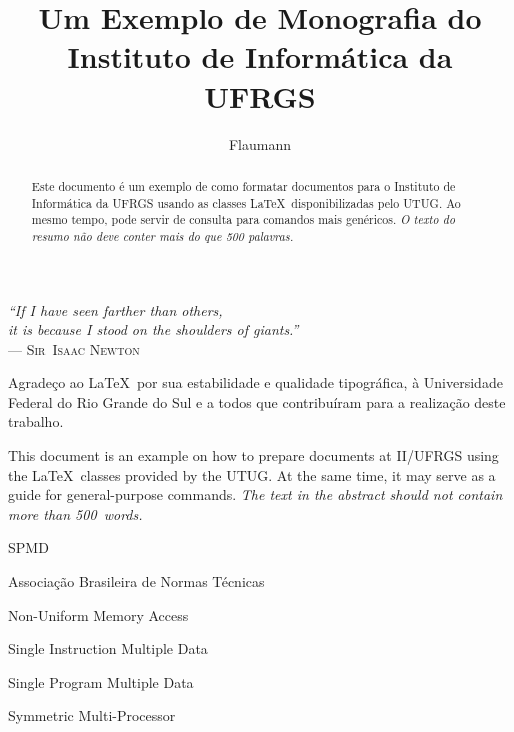 \documentclass[ecp,tc,biblatex]{iiufrgs}
\title{Um Exemplo de Monografia do Instituto de Informática da UFRGS}
\author{Flaumann}{Fritz Gutenberg}
\begin{document}
\renewcommand{\coadvisorname}{Coorientador}

\maketitle

\begin{dedicatoria}
\textit{``If I have seen farther than others,\\
it is because I stood on the shoulders of giants.''\\}
--- \textsc{Sir~Isaac Newton}
\end{dedicatoria}

\begin{agradecimentos}
Agradeço ao \LaTeX\ por sua estabilidade e qualidade tipográfica, à Universidade Federal do Rio Grande do Sul e a todos que contribuíram para a realização deste trabalho.
\end{agradecimentos}



\begin{abstract}
Este documento é um exemplo de como formatar documentos para o
Instituto de Informática da UFRGS usando as classes \LaTeX\
disponibilizadas pelo UTUG\@. Ao mesmo tempo, pode servir de consulta
para comandos mais genéricos. \emph{O texto do resumo não deve
conter mais do que 500 palavras.}
\end{abstract}

\begin{translatedabstract}
This document is an example on how to prepare documents at II/UFRGS
using the \LaTeX\ classes provided by the UTUG\@. At the same time, it
may serve as a guide for general-purpose commands. \emph{The text in
the abstract should not contain more than 500~words.}
\end{translatedabstract}

\begin{listofabbrv}{SPMD}
        \item[ABNT] Associação Brasileira de Normas Técnicas
        \item[NUMA] Non-Uniform Memory Access
        \item[SIMD] Single Instruction Multiple Data
        \item[SPMD] Single Program Multiple Data
        \item[SMP] Symmetric Multi-Processor
\end{listofabbrv}
\end{document}
